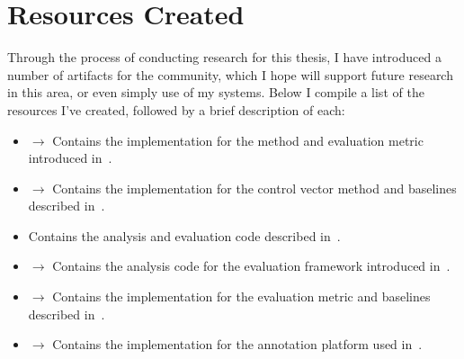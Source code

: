 \section{Resources Created}

Through the process of conducting research for this thesis, I have introduced a number of artifacts for the community, which I hope will support future research in this area, or even simply use of my systems. Below I compile a list of the resources I've created, followed by a brief description of each:
\begin{itemize}[label={\faGithub},noitemsep]
    \item {} {$\rightarrow$} Contains the implementation for the method and evaluation metric introduced in~.
    \item {} {$\rightarrow$} Contains the implementation for the control vector method and baselines described in~.
    \item{} Contains the analysis and evaluation code described in~.
    \item {} {$\rightarrow$} Contains the analysis code for the evaluation framework introduced in~.
    \item {} {$\rightarrow$} Contains the implementation for the evaluation metric and baselines described in~.
    \item {} {$\rightarrow$} Contains the implementation for the annotation platform used in~.
\end{itemize}


